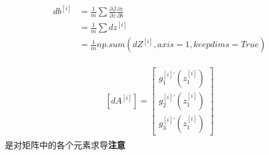 \documentclass{article}
\begin{document}
	\begin{equation}
	\begin{split}
	db^{[i]} &= \frac{1}{m}\sum \frac{\partial{J}}{\partial z}\frac{\partial{z}}{\partial b}\\
		& = \frac{1}{m}\sum dz^{[i]} \\
		& = \frac{1}{m}np.sum( dZ^{[i]} , axis = 1 , keepdims = True)
	\end{split}
	\end{equation}

	\begin{gather}
	\begin{split}
	[dA^{[i]}]
	=
	\left[\begin{array}{c}
		 g_{1}^{[i]'}(z_{1}^{[i]})  \\ g_{2}^{[i]'}(z_{1}^{[i]})  \\  g_{3}^{[i]'}(z_{1}^{[i]})
	\end{array}\right]
	\end{split}
	\end{gather}
	是对矩阵中的各个元素求导\textbf{注意}

\end{document}
